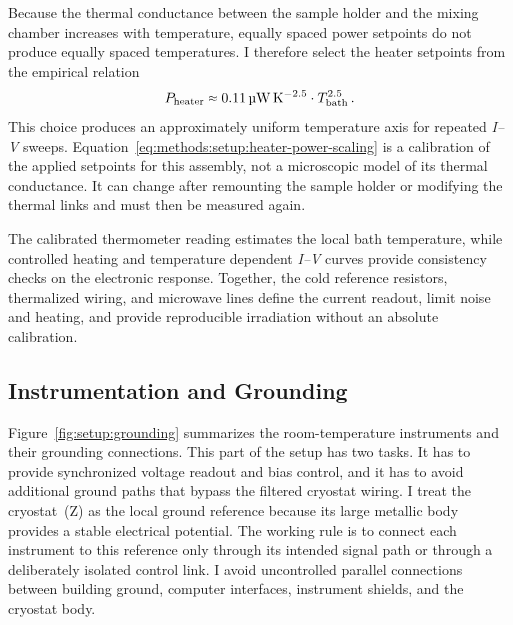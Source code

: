             Because the thermal conductance between the sample holder and the mixing chamber increases with temperature, equally spaced power setpoints do not produce equally spaced temperatures. I therefore select the heater setpoints from the empirical relation
            \begin{equation}
                P_\mathrm{heater} \sapprox \qty{0.11}{\micro\watt\per\kelvin\tothe{5/2}} \cdot T_\mathrm{bath}^{2.5}\,.
                \label{eq:methods:setup:heater-power-scaling}
            \end{equation}
            This choice produces an approximately uniform temperature axis for repeated \textit{I--V} sweeps. Equation~\eqref{eq:methods:setup:heater-power-scaling} is a calibration of the applied setpoints for this assembly, not a microscopic model of its thermal conductance. It can change after remounting the sample holder or modifying the thermal links and must then be measured again.

            The calibrated thermometer reading estimates the local bath temperature, while controlled heating and temperature dependent \textit{I--V} curves provide consistency checks on the electronic response. Together, the cold reference resistors, thermalized wiring, and microwave lines define the current readout, limit noise and heating, and provide reproducible irradiation without an absolute calibration.

    \subsection{Instrumentation and Grounding}
    \label{subsec:setup:instrumentation-grounding}
        
        Figure~\ref{fig:setup:grounding} summarizes the room-temperature instruments and their grounding connections. This part of the setup has two tasks. It has to provide synchronized voltage readout and bias control, and it has to avoid additional ground paths that bypass the filtered cryostat wiring. I treat the cryostat~(Z) as the local ground reference because its large metallic body provides a stable electrical potential. The working rule is to connect each instrument to this reference only through its intended signal path or through a deliberately isolated control link. I avoid uncontrolled parallel connections between building ground, computer interfaces, instrument shields, and the cryostat body.

